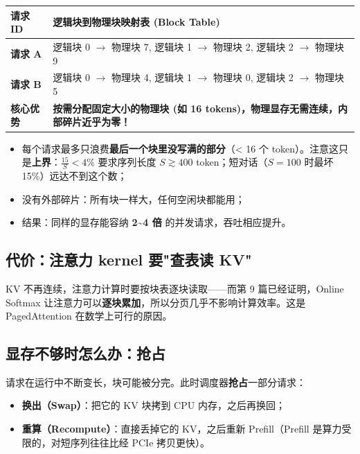 \begin{center}
\small
\begin{tabularx}{\textwidth}{l X}
\toprule
\textbf{请求 ID} & \textbf{逻辑块到物理块映射表 (Block Table)} \\
\midrule
\textbf{请求 A} & 逻辑块 0 $\to$ 物理块 7, \quad 逻辑块 1 $\to$ 物理块 2, \quad 逻辑块 2 $\to$ 物理块 9 \\
\textbf{请求 B} & 逻辑块 0 $\to$ 物理块 4, \quad 逻辑块 1 $\to$ 物理块 0, \quad 逻辑块 2 $\to$ 物理块 5 \\
\midrule
\textbf{核心优势} & \textbf{按需分配固定大小的物理块 (如 16 tokens)，物理显存无需连续，内部碎片近乎为零！} \\
\bottomrule
\end{tabularx}
\end{center}

\begin{itemize}
  \item 每个请求最多只浪费\textbf{最后一个块里没写满的部分}（< 16 个 token）。注意这只是\textbf{上界}：$\frac{15}{S} < 4\%$ 要求序列长度 $S \gtrsim 400$ token；短对话（$S=100$ 时最坏 15\%）远达不到这个数；
  \item 没有外部碎片：所有块一样大，任何空闲块都能用；
  \item 结果：同样的显存能容纳 \textbf{2\textasciitilde{}4 倍} 的并发请求，吞吐相应提升。
\end{itemize}

\subsection{代价：注意力 kernel 要"查表读 KV"}

KV 不再连续，注意力计算时要按块表逐块读取——而第 9 篇已经证明，Online Softmax 让注意力可以\textbf{逐块累加}，所以分页几乎不影响计算效率。这是 PagedAttention 在数学上可行的原因。

\subsection{显存不够时怎么办：抢占}

请求在运行中不断变长，块可能被分完。此时调度器\textbf{抢占}一部分请求：
\begin{itemize}
  \item \textbf{换出（Swap）}：把它的 KV 块拷到 CPU 内存，之后再换回；
  \item \textbf{重算（Recompute）}：直接丢掉它的 KV，之后重新 Prefill（Prefill 是算力受限的，对短序列往往比经 PCIe 拷贝更快）。
\end{itemize}

